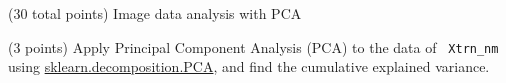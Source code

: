 \documentclass[12pt]{article}
\begin{document}
\begin{question}{(30 total points) Image data analysis with PCA}
\begin{subquestion}



   \end{subquestion}

   \begin{subquestion}{(3 points)
       Apply Principal Component Analysis (PCA) to the data of {\tt
         Xtrn\_nm} using \href{https://scikit-learn.org/0.19/modules/generated/sklearn.decomposition.PCA.html}{sklearn.decomposition.PCA}, and
       find the cumulative explained variance.
     } \label{Q1.pca.variance}




\end{subquestion}
\end{question}
\end{document}
